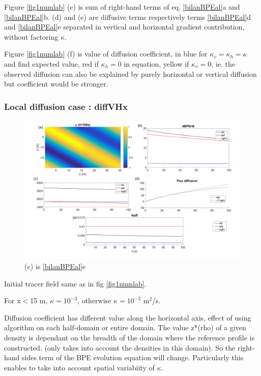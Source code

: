 Figure \ref{fig1numlab} (c) is sum of right-hand terms of eq. \ref{bilanBPEal}a and \ref{bilanBPEal}b. (d) and (e) are diffusive terms respectively terms \ref{bilanBPEal}d and \ref{bilanBPEal}e separated in vertical and horizontal gradient contribution, without factoring $\kappa$.

Figure \ref{fig1numlab} (f) is value of diffusion coefficient, in blue for $\kappa_v=\kappa_h=\kappa$ and find expected value, red if $\kappa_h=0$ in equation, yellow if $\kappa_v=0$, ie. the observed diffusion can also be explained by purely horizontal or vertical diffusion but coefficient would be stronger.

\subsubsection{Local diffusion case : diffVHx}

\begin{figure}[h!]
\centering
\includegraphics[width=1\textwidth]{./CHAP_BPE/AGBPE_numlab2.png}
\caption{(c) is \ref{bilanBPEal}e}
\label{fig2numlab}
\end{figure}

Initial tracer field same as in fig \ref{fig1numlab}.

For x$<$15 m, $\kappa = 10^{-3}$, otherwise $\kappa = 10^{-2}$ m$^2$/s.

Diffusion coefficient has different value along the horizontal axis, effect of using algorithm on each half-domain or entire domain. The value z*(rho) of a given density is dependant on the breadth of the domain where the reference profile is constructed. (only takes into account the densities in this domain). So the right-hand sides term of the BPE evolution equation will change. Particularly this enables to take into account spatial variabiity of $\kappa$.

